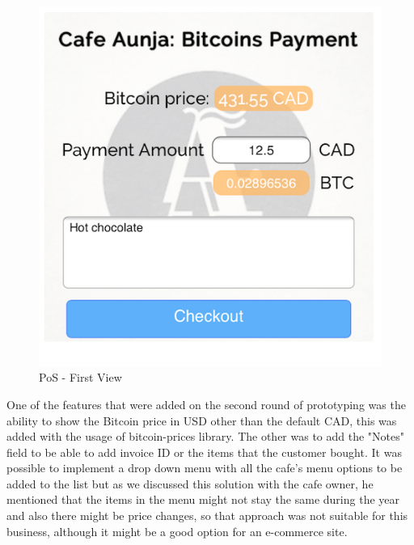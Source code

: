 \begin{figure}[htb!p]
\centering
\includegraphics[scale=0.5]{fig/First_View.png}
  \caption{PoS - First View}
\label{fig:First_View}
\end{figure}

One of the features that were added on the second round of prototyping was the ability to show the Bitcoin price in USD other than the default CAD, this was added with the usage of bitcoin-prices library. The other was to add the "Notes" field to be able to add invoice ID or the items that the customer bought. It was possible to implement a drop down menu with all the cafe's menu options to be added to the list but as we discussed this solution with the cafe owner, he mentioned that the items in the menu might not stay the same during the year and also there might be price changes, so that approach was not suitable for this business, although it might be a good option for an e-commerce site.

